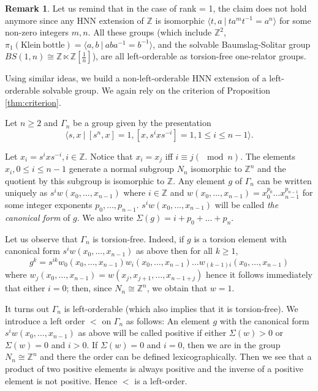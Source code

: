 \documentclass[12pt]{amsart}
\theoremstyle{definition}
\newtheorem{rem}[thm]{Remark}
\newcommand{\blackboard}[1]{\ensuremath{\mathbb{#1}}}
\newcommand{\Z}{\blackboard{Z}}
\begin{document}
 \begin{rem} Let us remind that in the case of rank = 1, the claim does not hold anymore since any HNN extension of $\Z $ is isomorphic $\langle t,a \ | \ ta^mt^{-1}=a^n\rangle $ for some non-zero integers $m,n$. All these groups (which include $\Z^2$, $\pi _1(\mathrm{Klein \ bottle}) = \langle a, b \ | \ aba^{-1} = b^{-1}\rangle $, and the solvable Baumslag-Solitar group $BS(1, n)\cong \Z\ltimes \Z[\frac{1}{n}]$), are all left-orderable as torsion-free one-relator groups.
 \end{rem}
 
 \medskip
 
 Using similar ideas, we build a non-left-orderable HNN extension of a left-orderable solvable group. We again rely on the criterion of Proposition \ref{thm:criterion}.
 
 
 
 \medskip
 
  Let $n\geq 2$ and $\Gamma _n$ be a group given by the presentation $$\langle s, x \ | \ [s^n,x]=1, [x, s^ixs^{-i}] = 1, 1\leq i\leq n-1 \rangle .$$
 
 Let $x_i = s^ixs^{-i}, i\in \mathbb{Z}$. Notice that $x_i = x_j$ iff $i\equiv j (\mod n)$. The elements $x_i, 0\leq i\leq n-1$ generate a normal subgroup $N_n$ isomorphic to $\mathbb{Z}^n$ and the quotient by this subgroup is isomorphic to $\mathbb{Z}$. Any element $g$ of $\Gamma _n$ can be written uniquely as $s^iw(x_0, \dots , x_{n-1})$ where $ i\in \mathbb{Z}$ and $w(x_0, \dots , x_{n-1}) = x_0^{p_0}\dots x_{n-1}^{p_{n-1}}$ for some integer exponents $p_0, \dots , p_{n-1}$. $s^iw(x_0, \dots , x_{n-1})$ will be called {\em the canonical form} of $g$. We also write $\Sigma (g) = i  +  p_0 + \dots + p_n$.
 
 \medskip
 
 Let us observe that $\Gamma _n$ is torsion-free. Indeed, if $g$ is a torsion element with canonical form $s^iw(x_0, \dots , x_{n-1})$ as above then for all $k\geq 1$, $$g^k = s^{ik}w_0(x_0, \dots , x_{n-1})w_i(x_0, \dots , x_{n-1})\dots w_{(k-1)i}(x_0, \dots , x_{n-1})$$ where $w_{j}(x_0, \dots , x_{n-1}) = w(x_j, x_{j+1}, \dots , x_{n-1+j})$ hence it follows immediately that either $i =0$; then, since $N_n\cong \mathbb{Z}^n$, we obtain that $w=1$.
 
 \medskip
 
 
 It turns out $\Gamma _n$ is left-orderable (which also implies that it is torsion-free). We  introduce a left order $<$ on $\Gamma _n$ as follows: An element $g$ with the canonical form $s^iw(x_0, \dots , x_{n-1})$ as above will be called positive if either $\Sigma (w) > 0$ or $\Sigma (w) = 0$ and $i > 0$.  If $\Sigma (w) = 0$ and $i = 0$, then we are in the group $N_n\cong \mathbb{Z}^n$ and there the order can be defined lexicographically. Then we see that a product of two positive elements is always positive and the inverse of a positive element is not positive. Hence $<$ is a left-order.
 
\end{document}
